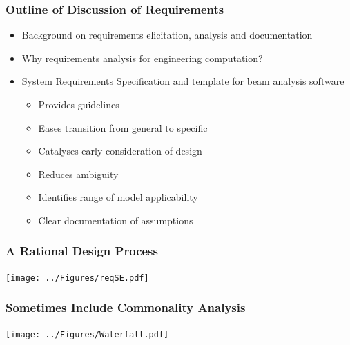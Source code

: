 \documentclass[t,12pt,numbers,fleqn]{beamer}
\begin{document}

\begin{frame}
\frametitle{Outline of Discussion of Requirements}

\begin{itemize}

\item Background on requirements elicitation, analysis and documentation
\item Why requirements analysis for engineering computation?

\item System Requirements Specification and template for beam analysis software
\begin{itemize}
\item Provides guidelines
\item Eases transition from general to specific
\item Catalyses early consideration of design
\item Reduces ambiguity
\item Identifies range of model applicability
\item Clear documentation of assumptions
\end{itemize}

\end{itemize}
\end{frame}


\begin{frame}
\frametitle{A Rational Design Process}
\begin{center}
 \texttt{[image: ../Figures/reqSE.pdf]}
\end{center}
\end{frame}


\begin{frame}
\frametitle{Sometimes Include Commonality Analysis}
\begin{center}
 \texttt{[image: ../Figures/Waterfall.pdf]}
\end{center}
\end{frame}

\end{document}
